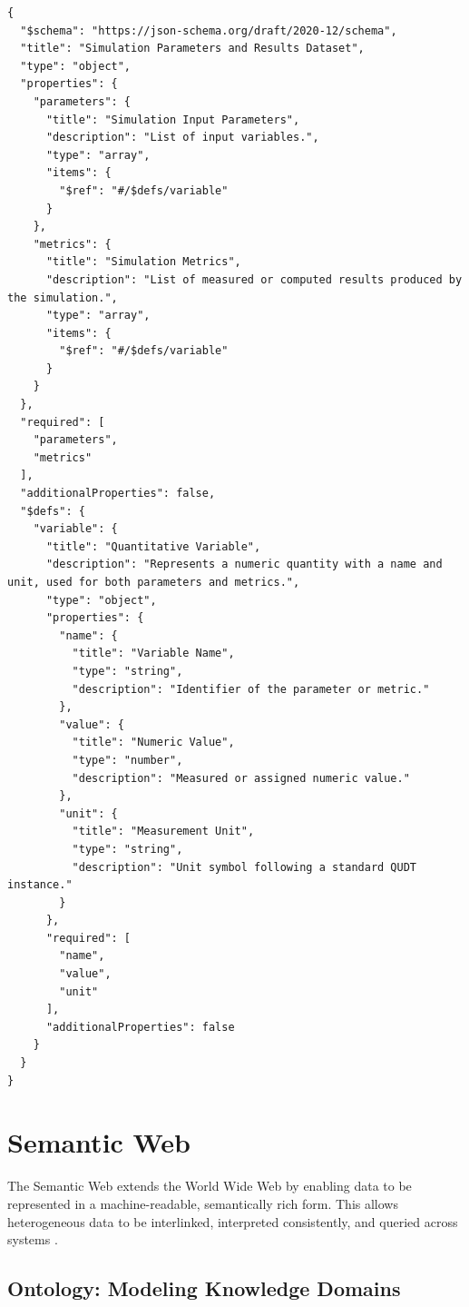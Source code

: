 \begin{lstlisting}[float=htbp,style=json, caption={JSON Schema validating the simulation result for JSON document in Listing~\ref{lst:background_json_example}}, label={lst:background_json_schema}]
{
  "$schema": "https://json-schema.org/draft/2020-12/schema",
  "title": "Simulation Parameters and Results Dataset",
  "type": "object",
  "properties": {
    "parameters": {
      "title": "Simulation Input Parameters",
      "description": "List of input variables.",
      "type": "array",
      "items": {
        "$ref": "#/$defs/variable"
      }
    },
    "metrics": {
      "title": "Simulation Metrics",
      "description": "List of measured or computed results produced by the simulation.",
      "type": "array",
      "items": {
        "$ref": "#/$defs/variable"
      }
    }
  },
  "required": [
    "parameters",
    "metrics"
  ],
  "additionalProperties": false,
  "$defs": {
    "variable": {
      "title": "Quantitative Variable",
      "description": "Represents a numeric quantity with a name and unit, used for both parameters and metrics.",
      "type": "object",
      "properties": {
        "name": {
          "title": "Variable Name",
          "type": "string",
          "description": "Identifier of the parameter or metric."
        },
        "value": {
          "title": "Numeric Value",
          "type": "number",
          "description": "Measured or assigned numeric value."
        },
        "unit": {
          "title": "Measurement Unit",
          "type": "string",
          "description": "Unit symbol following a standard QUDT instance."
        }
      },
      "required": [
        "name",
        "value",
        "unit"
      ],
      "additionalProperties": false
    }
  }
}
\end{lstlisting}

\section{Semantic Web}

The Semantic Web extends the World Wide Web by enabling data to be represented in a machine-readable, semantically rich form. This allows heterogeneous data to be interlinked, interpreted consistently, and queried across systems \cite{berners2001semantic}.

\subsection{Ontology: Modeling Knowledge Domains}
\label{sec:background:ontology}

